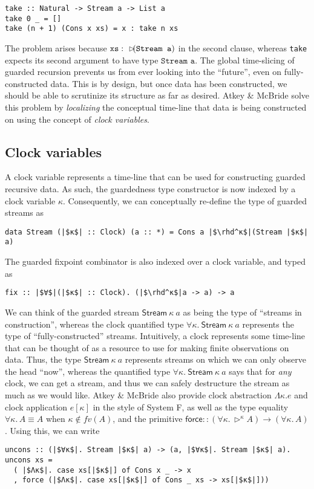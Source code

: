 \documentclass[sigplan,9pt,review]{acmart}\settopmatter{printfolios=true,printccs=false,printacmref=false}
\newcommand{\code}[1]{\texttt{#1}}
\begin{document}
\begin{verbatim}
take :: Natural -> Stream a -> List a
take 0 _ = []
take (n + 1) (Cons x xs) = x : take n xs
\end{verbatim}

The problem arises because $\code{xs} : \later (\code{Stream a})$ in the second clause,
whereas \code{take} expects its second argument to have type $\code{Stream a}$.
The global time-slicing of guarded recursion prevents us from ever looking into the ``future'',
even on fully-constructed data. This is by design, but once data has been constructed, we should
be able to scrutinize its structure as far as desired. Atkey \& McBride \cite{atkey2013productive} solve this
problem by \textit{localizing} the conceptual time-line that data is being constructed on
using the concept of \textit{clock variables}.

\subsection{Clock variables}
A clock variable represents a time-line that can be used for constructing guarded recursive
data. As such, the guardedness type constructor is now indexed by a clock variable $κ$.
Consequently, we can conceptually re-define the type of guarded streams as
\begin{verbatim}
data Stream (|$κ$| :: Clock) (a :: *) = Cons a |$\rhd^κ$|(Stream |$κ$| a)
\end{verbatim}

The guarded fixpoint combinator is also indexed over a clock variable, and typed as

\begin{verbatim}
fix :: |$∀$|(|$κ$| :: Clock). (|$\rhd^κ$|a -> a) -> a
\end{verbatim}

We can think of the guarded stream $\mathsf{Stream}\ κ\ a$ as being the type of ``streams in
construction'', whereas the clock quantified type $∀κ.\ \mathsf{Stream}\ κ\ a$ represents the
type of ``fully-constructed'' streams. Intuitively, a clock represents some time-line that
can be thought of as a resource to use for making finite observations on data. Thus, the
type $\mathsf{Stream}\ κ\ a$ represents streams on which we can only observe the head ``now'',
whereas the quantified type $∀κ.\ \mathsf{Stream}\ κ\ a$ says that for \textit{any} clock,
we can get a stream, and thus we can safely destructure the stream as much as we would like.
Atkey \& McBride \cite{atkey2013productive} also provide clock abstraction $Λκ. e$ and clock application
$e[κ]$ in the style of System F, as well as the type equality $∀κ.\, A ≡ A$ when $κ ∉ fv(A)$,
and the primitive $\mathsf{force} :: (∀κ.\, \rhd^κ A) → (∀κ.\, A)$. Using this, we can
write
\begin{verbatim}
uncons :: (|$∀κ$|. Stream |$κ$| a) -> (a, |$∀κ$|. Stream |$κ$| a).
uncons xs =
  ( |$Λκ$|. case xs[|$κ$|] of Cons x _ -> x
  , force (|$Λκ$|. case xs[|$κ$|] of Cons _ xs -> xs[|$κ$|]))
\end{verbatim}
\end{document}
